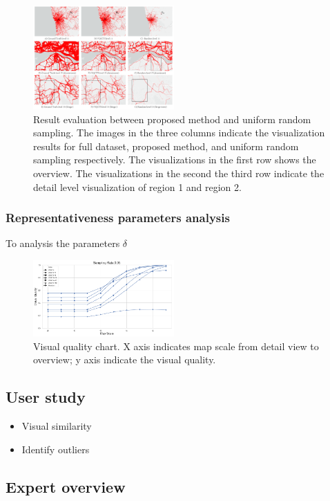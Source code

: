 \begin{figure}[t]
	\centering
	\includegraphics[width=0.48\textwidth]{pictures/experiment_study/Mehtod_resolution_study.pdf}
	\vspace{-5mm}
	\caption{Result evaluation between proposed method and uniform random sampling. The images in the three columns indicate the visualization results for full dataset, proposed method, and uniform random sampling respectively. The visualizations in the first row shows the overview. The visualizations in the second the third row indicate the detail level visualization of region 1 and region 2. }
	\vspace{-5mm}
	\label{fig:random_proposed}
\end{figure}

\subsubsection{Representativeness parameters analysis}
To analysis the parameters  $\delta$


\begin{figure}[t]
	\centering
	\vspace{2mm}
	\includegraphics[width=0.48\textwidth]{pictures/experiment_study/quanlity.png}
	\caption{Visual quality chart. X axis indicates map scale from detail view to overview; y axis indicate the visual quality. }
	\vspace{0mm}
	\label{fig:quality_chart}
\end{figure}

\subsection{User study}
\begin{itemize}[noitemsep]
    \item Visual similarity
    \item Identify outliers
\end{itemize}

\subsection{Expert overview}

